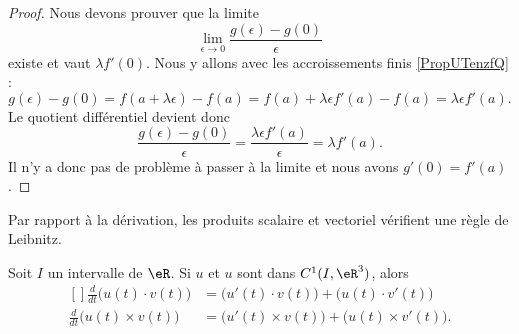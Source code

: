 \begin{proof}
    Nous devons prouver que la limite
    \begin{equation}
        \lim_{\epsilon\to 0}\frac{ g(\epsilon)-g(0) }{ \epsilon }
    \end{equation}
    existe et vaut \( \lambda f'(0)\). Nous y allons avec les accroissements finis \ref{PropUTenzfQ} :
    \begin{equation}
        g(\epsilon)-g(0)=f(a+\lambda \epsilon)-f(a)=f(a)+\lambda \epsilon f'(a)-f(a)=\lambda\epsilon f'(a). 
    \end{equation}
    Le quotient différentiel devient donc
    \begin{equation}
        \frac{ g(\epsilon)-g(0) }{ \epsilon }=\frac{ \lambda \epsilon f'(a) }{ \epsilon }=\lambda f'(a).
    \end{equation}
    Il n'y a donc pas de problème à passer à la limite et nous avons \( g'(0)=f'(a)\).
\end{proof}

Par rapport à la dérivation, les produits scalaire et vectoriel vérifient une règle de Leibnitz. 
\begin{proposition}     \label{PROPooFKKHooQZGXhE}
    Soit $I$ un intervalle de $\eR$. Si $u$ et $u$ sont dans $C^1(I,\eR^3)$, alors
    \begin{equation}		\label{EqFormLeibProdscalVect}
        \begin{aligned}[]
            \frac{ d }{ dt }\big( u(t)\cdot v(t) \big)&=\big( u'(t)\cdot v(t) \big)+\big( u(t)\cdot v'(t) \big)\\
            \frac{ d }{ dt }\big( u(t)\times v(t) \big)&=\big( u'(t)\times v(t) \big)+\big( u(t)\times v'(t) \big).
        \end{aligned}
    \end{equation}
\end{proposition}


